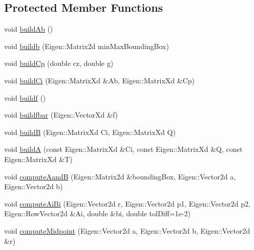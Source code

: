 \subsection*{\-Protected \-Member \-Functions}
\begin{DoxyCompactItemize}
\item 
void \hyperlink{classBaseOfSupport_a70bb139aba387291e0180458a53fb8e5}{build\-Ab} ()
\item 
void \hyperlink{classBaseOfSupport_ab8dfd61d0b11e780e88ae972f9542336}{buildb} (\-Eigen\-::\-Matrix2d min\-Max\-Bounding\-Box)
\item 
void \hyperlink{classBaseOfSupport_a7efc6cad789632e88d8c85ab171a9eef}{build\-Cp} (double cz, double g)
\item 
void \hyperlink{classBaseOfSupport_a44cb4e3826c95af4b605309a8bcfc03c}{build\-Ci} (\-Eigen\-::\-Matrix\-Xd \&\-Ab, \-Eigen\-::\-Matrix\-Xd \&\-Cp)
\item 
void \hyperlink{classBaseOfSupport_af5bb488bb7004a8b14dd0617c4c27700}{buildf} ()
\item 
void \hyperlink{classBaseOfSupport_afe923e94cbb6308dc3028f72a7ee82db}{buildfbar} (\-Eigen\-::\-Vector\-Xd \&f)
\item 
void \hyperlink{classBaseOfSupport_a7bb54c5f9b2021dd5e393b19e36f0167}{build\-B} (\-Eigen\-::\-Matrix\-Xd \-Ci, \-Eigen\-::\-Matrix\-Xd \-Q)
\item 
void \hyperlink{classBaseOfSupport_ab0a2eb399e02b43872d2917c683d6a08}{build\-A} (const \-Eigen\-::\-Matrix\-Xd \&\-Ci, const \-Eigen\-::\-Matrix\-Xd \&\-Q, const \-Eigen\-::\-Matrix\-Xd \&\-T)
\item 
void \hyperlink{classBaseOfSupport_ac912464ec5a8f70374dae34d3d823bdb}{compute\-Aand\-B} (\-Eigen\-::\-Matrix2d \&bounding\-Box, \-Eigen\-::\-Vector2d a, \-Eigen\-::\-Vector2d b)
\item 
void \hyperlink{classBaseOfSupport_a09b197a9869db126658d227532c1e03a}{compute\-Ai\-Bi} (\-Eigen\-::\-Vector2d r, \-Eigen\-::\-Vector2d p1, \-Eigen\-::\-Vector2d p2, \-Eigen\-::\-Row\-Vector2d \&\-Ai, double \&bi, double tol\-Diff=1e-\/2)
\item 
void \hyperlink{classBaseOfSupport_ad9a709f6df002662bfd67982a2c0e201}{compute\-Midpoint} (\-Eigen\-::\-Vector2d a, \-Eigen\-::\-Vector2d b, \-Eigen\-::\-Vector2d \&r)
\end{DoxyCompactItemize}
